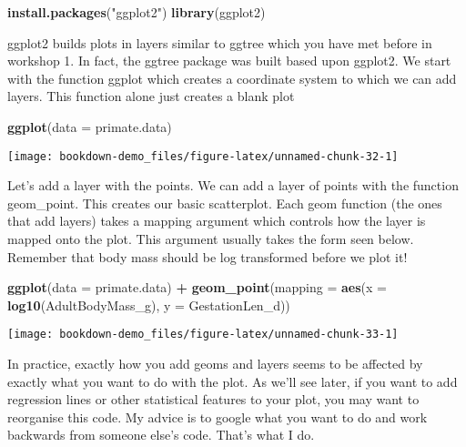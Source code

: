 \documentclass[]{book}
\newenvironment{Shaded}{\begin{snugshade}}{\end{snugshade}}
\newcommand{\KeywordTok}[1]{\textcolor[rgb]{0.13,0.29,0.53}{\textbf{#1}}}
\newcommand{\DataTypeTok}[1]{\textcolor[rgb]{0.13,0.29,0.53}{#1}}
\newcommand{\StringTok}[1]{\textcolor[rgb]{0.31,0.60,0.02}{#1}}
\newcommand{\OperatorTok}[1]{\textcolor[rgb]{0.81,0.36,0.00}{\textbf{#1}}}
\newcommand{\NormalTok}[1]{#1}
\begin{document}
\begin{Shaded}
\begin{Highlighting}[]
\KeywordTok{install.packages}\NormalTok{(}\StringTok{"ggplot2"}\NormalTok{)}
\KeywordTok{library}\NormalTok{(ggplot2)}
\end{Highlighting}
\end{Shaded}

ggplot2 builds plots in layers similar to ggtree which you have met
before in workshop 1. In fact, the ggtree package was built based upon
ggplot2. We start with the function ggplot which creates a coordinate
system to which we can add layers. This function alone just creates a
blank plot

\begin{Shaded}
\begin{Highlighting}[]
\KeywordTok{ggplot}\NormalTok{(}\DataTypeTok{data =}\NormalTok{ primate.data)}
\end{Highlighting}
\end{Shaded}

\begin{center}\texttt{[image: bookdown-demo\_files/figure-latex/unnamed-chunk-32-1]} \end{center}

Let's add a layer with the points. We can add a layer of points with the
function geom\_point. This creates our basic scatterplot. Each geom
function (the ones that add layers) takes a mapping argument which
controls how the layer is mapped onto the plot. This argument usually
takes the form seen below. Remember that body mass should be log
transformed before we plot it!

\begin{Shaded}
\begin{Highlighting}[]
\KeywordTok{ggplot}\NormalTok{(}\DataTypeTok{data =}\NormalTok{ primate.data) }\OperatorTok{+}
\StringTok{  }\KeywordTok{geom_point}\NormalTok{(}\DataTypeTok{mapping =} \KeywordTok{aes}\NormalTok{(}\DataTypeTok{x =} \KeywordTok{log10}\NormalTok{(AdultBodyMass_g), }\DataTypeTok{y =}\NormalTok{ GestationLen_d))}
\end{Highlighting}
\end{Shaded}

\begin{center}\texttt{[image: bookdown-demo\_files/figure-latex/unnamed-chunk-33-1]} \end{center}

In practice, exactly how you add geoms and layers seems to be affected
by exactly what you want to do with the plot. As we'll see later, if you
want to add regression lines or other statistical features to your plot,
you may want to reorganise this code. My advice is to google what you
want to do and work backwards from someone else's code. That's what I
do.
\end{document}

